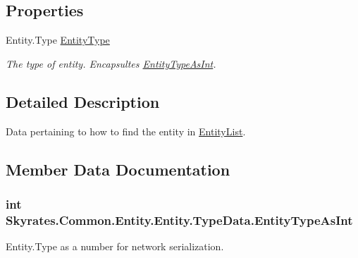 \subsection*{Properties}
\begin{DoxyCompactItemize}
\item 
Entity.\-Type \hyperlink{class_skyrates_1_1_common_1_1_entity_1_1_entity_1_1_type_data_a77a694c041e70f02ca1bcc12b9244de5}{Entity\-Type}
\begin{DoxyCompactList}\small\item\em The type of entity. Encapsultes \hyperlink{class_skyrates_1_1_common_1_1_entity_1_1_entity_1_1_type_data_ae1d503ba32f705ea1c76887377b9ca41}{Entity\-Type\-As\-Int}. \end{DoxyCompactList}\end{DoxyCompactItemize}


\subsection{Detailed Description}
Data pertaining to how to find the entity in \hyperlink{class_skyrates_1_1_common_1_1_entity_1_1_entity_list}{Entity\-List}. 



\subsection{Member Data Documentation}
\hypertarget{class_skyrates_1_1_common_1_1_entity_1_1_entity_1_1_type_data_ae1d503ba32f705ea1c76887377b9ca41}{
\subsubsection[{Entity\-Type\-As\-Int}]{\setlength{\rightskip}{0pt plus 5cm}int Skyrates.\-Common.\-Entity.\-Entity.\-Type\-Data.\-Entity\-Type\-As\-Int}}\label{class_skyrates_1_1_common_1_1_entity_1_1_entity_1_1_type_data_ae1d503ba32f705ea1c76887377b9ca41}


Entity.\-Type as a number for network serialization. 

